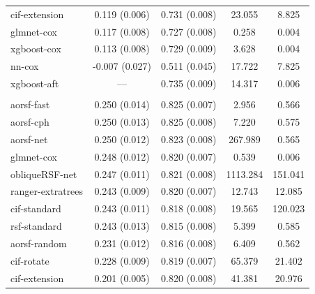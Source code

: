 \documentclass[twoside,11pt]{article}\usepackage[]{graphicx}\usepackage[]{xcolor}
\newenvironment{knitrout}{}{} %
\begin{document}
\begin{knitrout}
\begin{longtable}[t]{lcccc}
\hspace{1em}cif-extension & 0.119 (0.006) & 0.731 (0.008) & 23.055 & 8.825\\
\hspace{1em}glmnet-cox & 0.117 (0.008) & 0.727 (0.008) & 0.258 & 0.004\\
\hspace{1em}xgboost-cox & 0.113 (0.008) & 0.729 (0.009) & 3.628 & 0.004\\
\hspace{1em}nn-cox & -0.007 (0.027) & 0.511 (0.045) & 17.722 & 7.825\\
\hspace{1em}xgboost-aft & --- & 0.735 (0.009) & 14.317 & 0.006\\
\addlinespace[0.3em]
\multicolumn{5}{l}{\textit{\textbf{Serum free light chain; death, n = 7874, p = 10}}}\\
\hline
\hspace{1em}aorsf-fast & 0.250 (0.014) & 0.825 (0.007) & 2.956 & 0.566\\
\hspace{1em}aorsf-cph & 0.250 (0.013) & 0.825 (0.008) & 7.220 & 0.575\\
\hspace{1em}aorsf-net & 0.250 (0.012) & 0.823 (0.008) & 267.989 & 0.565\\
\hspace{1em}glmnet-cox & 0.248 (0.012) & 0.820 (0.007) & 0.539 & 0.006\\
\hspace{1em}obliqueRSF-net & 0.247 (0.011) & 0.821 (0.008) & 1113.284 & 151.041\\
\hspace{1em}ranger-extratrees & 0.243 (0.009) & 0.820 (0.007) & 12.743 & 12.085\\
\hspace{1em}cif-standard & 0.243 (0.011) & 0.818 (0.008) & 19.565 & 120.023\\
\hspace{1em}rsf-standard & 0.243 (0.013) & 0.815 (0.008) & 5.399 & 0.585\\
\hspace{1em}aorsf-random & 0.231 (0.012) & 0.816 (0.008) & 6.409 & 0.562\\
\hspace{1em}cif-rotate & 0.228 (0.009) & 0.819 (0.007) & 65.379 & 21.402\\
\hspace{1em}cif-extension & 0.201 (0.005) & 0.820 (0.008) & 41.381 & 20.976\\

\end{longtable}
\end{knitrout}
\end{document}
